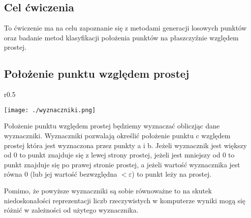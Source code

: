 \subsection{Cel ćwiczenia}
\quad To ćwiczenie ma na celu zapoznanie się z metodami generacji 
losowych punktów oraz badanie metod klasyfikacji położenia punktów na płaszczyźnie 
względem prostej. 
\subsection{Położenie punktu względem prostej}

\begin{wrapfigure}{r}{0.5\textwidth}

\texttt{[image: ./wyznaczniki.png]}
\end{wrapfigure}

\quad Położenie punktu względem prostej będziemy wyznaczać obliczjąc
dane wyznaczniki. Wyznaczniki pozwalają określić położenie
punktu c względem prostej która jest wyznaczona przez punkty a i b.
Jeżeli wyznacznik jest większy od 0 to punkt znajduje się z lewej strony prostej, jeżeli jest mniejszy
od 0  to
punkt znajduje się po prawej stronie prostej, a jeżeli wartość wyznacznika
jest równa 0 (lub jej wartość bezwzględna $< \varepsilon$) to punkt leży na prostej.

\quad Pomimo, że
powyższe wyznaczniki są sobie równoważne to na skutek
niedoskonałości reprezentacji liczb rzeczywistych w komputerze wyniki
mogą się różnić w zależności od użytego wyznacznika.